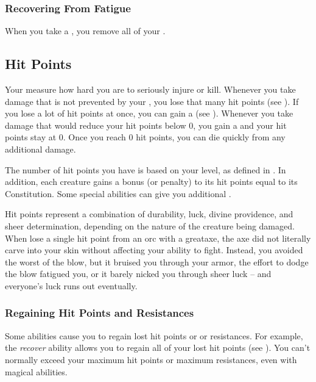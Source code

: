         \subsubsection{Recovering From Fatigue}
            When you take a , you remove all of your .

    \subsection{Hit Points}\label{Hit Points}
        Your  measure how hard you are to seriously injure or kill.
        Whenever you take damage that is not prevented by your , you lose that many hit points (see ).
        If you lose a lot of hit points at once, you can gain a  (see ).
        Whenever you take damage that would reduce your hit points below 0, you gain a  and your hit points stay at 0.
        Once you reach 0 hit points, you can die quickly from any additional damage.

        The number of hit points you have is based on your level, as defined in .
        In addition, each creature gains a bonus (or penalty) to its hit points equal to its Constitution.
        Some special abilities can give you additional .

         Hit points represent a combination of durability, luck, divine providence, and sheer determination, depending on the nature of the creature being damaged.
        When lose a single hit point from an orc with a greataxe, the axe did not literally carve into your skin without affecting your ability to fight.
        Instead, you avoided the worst of the blow, but it bruised you through your armor, the effort to dodge the blow fatigued you, or it barely nicked you through sheer luck -- and everyone's luck runs out eventually.


        \subsubsection{Regaining Hit Points and Resistances}\label{Regaining Hit Points and Resistances}
            Some abilities cause you to regain lost hit points or or resistances.
            For example, the \textit{recover} ability allows you to regain all of your lost hit points (see ).
            You can't normally exceed your maximum hit points or maximum resistances, even with magical abilities.

